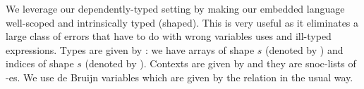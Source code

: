 We leverage our dependently-typed setting by making our
embedded language well-scoped and intrinsically typed (shaped).
This is very useful as it eliminates a large class of errors that have to do
with wrong variables uses and ill-typed expressions.
Types are given by : we have arrays of
shape $s$ (denoted by ) and indices of shape $s$
(denoted by ).  Contexts are given by  and they are
snoc-lists of -es.  We use de Bruijn variables which are given
by the relation  in the usual way. 
